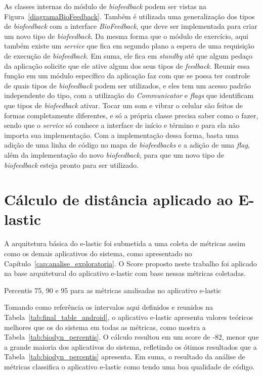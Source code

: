 As classes internas do módulo de \textit{biofeedback} podem ser vistas na Figura~\ref{diagramaBioFeedback}. Também é utilizada uma generalização dos tipos de \textit{biofeedback} com a interface \textit{BioFeedback}, que deve ser implementada para criar um novo tipo de \textit{biofeedback}. Da mesma forma que o módulo de exercício, aqui também existe um \textit{service} que fica em segundo plano a espera de uma requisição de execução de \textit{biofeedback}. Em suma, ele fica em \textit{standby} até que algum pedaço da aplicação solicite que ele ative algum dos seus tipos de \textit{feedback}. Reunir essa função em um módulo específico da aplicação faz com que se possa ter controle de quais tipos de \textit{biofeedback} podem ser utilizados, e eles tem um acesso padrão independente do tipo, com a utilização do \textit{Communicator} e \textit{flags} que identificam que tipos de \textit{biofeedback} ativar. Tocar um som e vibrar o celular são feitos de formas completamente diferentes, e só a própria classe precisa saber como o fazer, sendo que o \textit{service} só conhece a interface de início e término e para ela não importa sua implementação. Com a implementação dessa forma, basta uma adição de uma linha de código no mapa de \textit{biofeedbacks} e a adição de uma \textit{flag}, além da implementação do novo \textit{biofeedback}, para que um novo tipo de \textit{biofeedback} esteja pronto para ser utilizado.

\section{Cálculo de distância aplicado ao E-lastic}
A arquitetura básica do e-lastic foi submetida a uma coleta de métricas assim como os demais aplicativos do sistema, como apresentado no Capítulo~\ref{cap:analise_exploratoria}. O Score proposto neste trabalho foi aplicado na base arquitetural do aplicativo e-lastic com base nessas métricas coletadas.

\begin{table}[!htb]
\centering
{}

\caption{Percentis 75, 90 e 95 para as métricas analisadas no aplicativo e-lastic}
\label{tab:biodyn_percentis}
\end{table}

Tomando como referência os intervalos aqui definidos e reunidos na Tabela~\ref{tab:final_table_android}, o aplicativo e-lastic apresenta valores teóricos melhores que os do sistema em todas as métricas, como mostra a Tabela~\ref{tab:biodyn_percentis}. O cálculo resultou em um score de -82, menor que a grande maioria dos aplicativos do sistema, refletindo os ótimos resultados que a Tabela~\ref{tab:biodyn_percentis} apresenta. Em suma, o resultado da análise de métricas classifica o aplicativo e-lastic como tendo uma boa qualidade de código.

